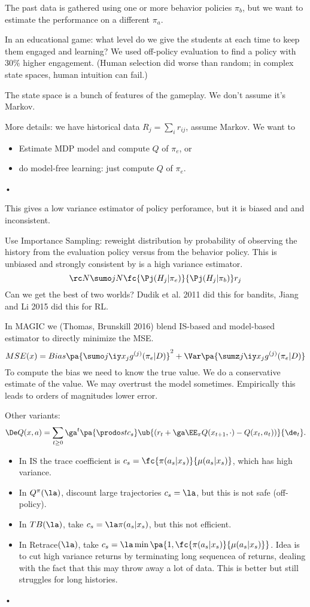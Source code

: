 The past data is gathered using one or more behavior policies $\pi_b$, but we want to estimate the performance on a different $\pi_a$.

In an educational game: what level do we give the students at each time to keep them engaged and learning? We used off-policy evaluation to find a policy with 30$\%$ higher engagement. (Human selection did worse than random; in complex state spaces, human intuition can fail.)

The state space is a bunch of features of the gameplay. We don't assume it's Markov.

More details: we have historical data $R_j = \sum_i r_{ij}$, assume Markov. We want to 
\begin{itemize}
\item
Estimate MDP model and compute $Q$ of $\pi_e$, or
\item
 do model-free learning: just compute $Q$ of $\pi_e$.
\end{itemize}•

This gives a low variance estimator of policy perforamce, but it is biased and and inconsistent.

Use Importance Sampling: reweight distribution by probability of observing the history from the evaluation policy versus from the behavior policy.  This is unbiased and strongly consistent by is a high variance estimator.
$$
\rc N \sumo jN \fc{\Pj(H_j|\pi_e)}{\Pj(H_j|\pi_b)}r_j
$$
Can we get the best of two worlds? Dudik et al. 2011 did this for bandits, Jiang and Li 2015 did this for RL.

In MAGIC we (Thomas, Brunskill 2016) blend IS-based and model-based estimator to directly minimize the MSE.
$$
MSE(x) = Bias\pa{\sumo j\iy x_j g^{(j)}(\pi_e|D)}^2 + \Var\pa{\sumz j\iy x_j g^{(j)}(\pi_e|D)}
$$
To compute the bias we need to know the true value. We do a conservative estimate of the value. We may overtrust the model sometimes.  Empirically this leads to orders of magnitudes lower error.

Other variants:
$$
\De Q(x,a) = \sum_{t\ge 0} \ga^t \pa{\prodo st c_s}\ub{(r_t+\ga\EE_\pi Q(x_{t+1},\cdot) - Q(x_t,a_t))}{\de_t}.
$$
\begin{itemize}
\item
In IS the trace coefficient is $c_s = \fc{\pi(a_s|x_s)}{\mu(a_s|x_s)}$, which has high variance. 
\item
In $Q^\pi(\la)$, discount large trajectories $c_s=\la$, but this is not safe (off-policy). 
\item
In $TB(\la)$, take $c_s = \la \pi(a_s|x_s)$, but this not efficient. %
\item
In Retrace$(\la)$, take $c_s = \la \min\pa{1, \fc{\pi(a_s|x_s)}{\mu(a_s|x_s)}}$. Idea is to cut high variance returns by terminating long sequencea of returns, dealing with the fact that this may throw away a lot of data. This is better but still struggles for long histories.
\end{itemize}•

